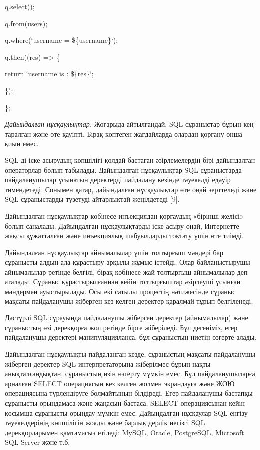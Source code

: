 q.select(\textquotesingle*\textquotesingle);

q.from(\textquotesingle users\textquotesingle);

q.where(`username = \$\{username\}`);

q.then((res) =\textgreater{} \{

return `username is : \$\{res\}`;

\});

\};

\emph{Дайындалған нұсқаулықтар.} Жоғарыда айтылғандай, SQL-сұраныстар
бұрын кең таралған және өте қауіпті. Бірақ көптеген жағдайларда олардан
қорғану онша қиын емес.

SQL-ді іске асырудың көпшілігі қолдай бастаған әзірлемелердің бірі
дайындалған операторлар болып табылады. Дайындалған нұсқаулықтар
SQL-сұраныстарда пайдаланушылар ұсынатын деректерді пайдалану кезінде
тәуекелді едәуір төмендетеді. Сонымен қатар, дайындалған нұсқаулықтар
өте оңай зерттеледі және SQL-сұраныстарды түзетуді айтарлықтай
жеңілдетеді {[}9{]}.

Дайындалған нұсқаулықтар көбінесе инъекциядан қорғаудың «бірінші желісі»
болып саналады. Дайындалған нұсқаулықтарды іске асыру оңай, Интернетте
жақсы құжатталған және инъекциялық шабуылдарды тоқтату үшін өте тиімді.

Дайындалған нұсқаулықтар айнымалылар үшін толтырғыш мәндері бар
сұранысты алдын ала құрастыру арқылы жұмыс істейді. Олар байланыстырушы
айнымалылар ретінде белгілі, бірақ көбінесе жай толтырғыш айнымалылар
деп аталады. Сұраныс құрастырылғаннан кейін толтырғыштар әзірлеуші
ұсынған мәндермен ауыстырылады. Осы екі сатылы процестің нәтижесінде
сұраныс мақсаты пайдаланушы жіберген кез келген деректер қаралмай тұрып
белгіленеді.

Дәстүрлі SQL сұрауында пайдаланушы жіберген деректер (айнымалылар) және
сұраныстың өзі дерекқорға жол ретінде бірге жіберіледі. Бұл дегеніміз,
егер пайдаланушы деректері манипуляцияланса, бұл сұраныстың ниетін
өзгерте алады.

Дайындалған нұсқаулықты пайдаланған кезде, сұраныстың мақсаты
пайдаланушы жіберген деректер SQL интерпретаторына жіберілмес бұрын
нақты анықталғандықтан, сұраныстың өзін өзгерту мүмкін емес. Бұл
пайдаланушыларға арналған SELECT операциясын кез келген жолмен
экрандауға және ЖОЮ операциясына түрлендіруге болмайтынын білдіреді.
Егер пайдаланушы бастапқы сұранысты орындамаса және жаңасын бастаса,
SELECT операциясынан кейін қосымша сұранысты орындау мүмкін емес.
Дайындалған нұсқаулар SQL енгізу тәуекелдерінің көпшілігін жояды және
барлық дерлік негізгі SQL дерекқорларымен қамтамасыз етіледі: MySQL,
Oracle, PostgreSQL, Microsoft SQL Server және т.б.

